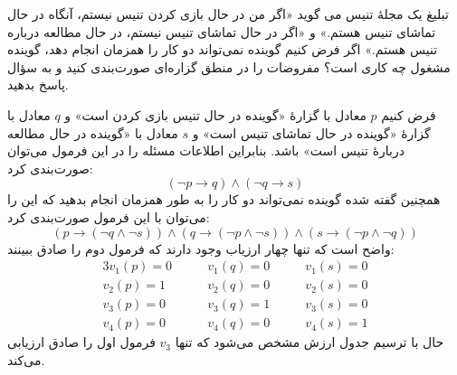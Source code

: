 تبلیغ یک مجلهٔ تنیس می گوید «اگر من در حال بازی کردن تنیس نیستم، آنگاه در حال تماشای تنیس هستم.» و «اگر در حال تماشای تنیس نیستم، در حال مطالعه درباره تنیس هستم.» اگر فرض کنیم گوینده نمی‌تواند دو کار را همزمان انجام دهد، گوینده مشغول چه کاری است؟ مفروضات را در منطق گزاره‌ای صورت‌بندی کنید و به سؤال پاسخ بدهید.
\begin{ans}
	فرض کنیم
    $p$
    معادل با گزارهٔ
    «گوینده در حال تنیس بازی کردن است»
    و
    $q$
    معادل با گزارهٔ
    «گوینده در حال تماشای تنیس است»
    و
    $s$
    معادل با
    «گوینده در حال مطالعه دربارهٔ تنیس است»
    باشد. بنابراین اطلاعات مسئله را در این فرمول می‌توان صورت‌بندی کرد:
    $$(\neg p \to q)\wedge(\neg q \to s)$$
    همچنین گفته شده گوینده نمی‌تواند دو کار را به طور همزمان انجام بدهید که این را می‌توان با این فرمول صورت‌بندی کرد:
    $$(p \to (\neg q \wedge \neg s)) \wedge (q \to (\neg p \wedge \neg s)) \wedge (s \to (\neg p \wedge \neg q))$$
    واضح است که تنها چهار ارزیاب وجود دارند که فرمول دوم را صادق ببینند:
    \begin{alignat*}{3}
        v_1(p) = 0 &\qquad v_1(q) = 0 &\qquad v_1(s) = 0 \\
        v_2(p) = 1 &\qquad v_2(q) = 0 &\qquad v_2(s) = 0 \\
        v_3(p) = 0 &\qquad v_3(q) = 1 &\qquad v_3(s) = 0 \\
        v_4(p) = 0 &\qquad v_4(q) = 0 &\qquad v_4(s) = 1
    \end{alignat*}
    حال با ترسیم جدول ارزش مشخص می‌شود که تنها
    $v_3$
    فرمول اول را صادق ارزیابی می‌کند. 
\end{ans}
